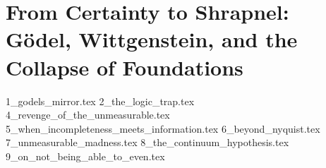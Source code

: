 \section{From Certainty to Shrapnel: Gödel, Wittgenstein, and the Collapse of Foundations}

{1_godels_mirror.tex}
{2_the_logic_trap.tex}
{4_revenge_of_the_unmeasurable.tex}
{5_when_incompleteness_meets_information.tex}
{6_beyond_nyquist.tex}
{7_unmeasurable_madness.tex}
{8_the_continuum_hypothesis.tex}
{9_on_not_being_able_to_even.tex}
